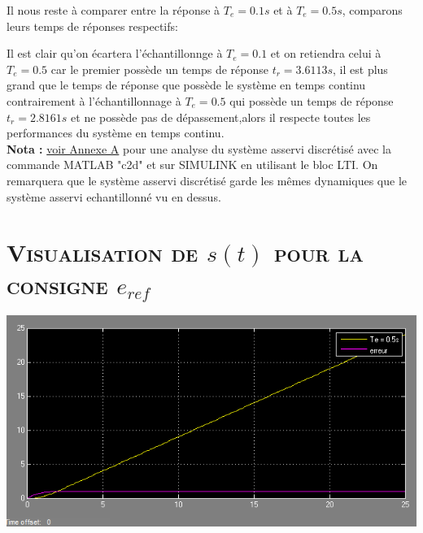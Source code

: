 Il nous reste à comparer entre la réponse à $T_e=0.1s$ et à  $T_e=0.5s$, comparons leurs temps de réponses respectifs:\\
   
   	
	
\par Il est clair qu'on écartera l'échantillonnge à $T_e=0.1$ et on retiendra celui à $T_e=0.5$ car le premier possède un temps de réponse $t_r=3.6113s$, il est plus grand que le temps de réponse que possède le système en temps continu contrairement à l'échantillonnage à $T_e=0.5 $ qui possède un temps de réponse $t_r = 2.8161 s$ et ne possède pas de dépassement,alors il respecte toutes les performances du système en temps continu.\\ 	
	

\textbf{Nota :} \label{section 2.2.2} \hyperref[Annexe A]{voir Annexe A} pour une analyse du système asservi discrétisé avec la commande MATLAB "c2d" et sur SIMULINK en utilisant le bloc LTI. On remarquera que le système asservi discrétisé garde les mêmes dynamiques que le système asservi echantillonné vu en dessus.

\section{\textsc{Visualisation de $s(t)$ pour la consigne $e_{ref}$}}

	\begin{center}
	\includegraphics[scale=0.5]{simu3.png}
	\label{fig11} 
	\end{center}

